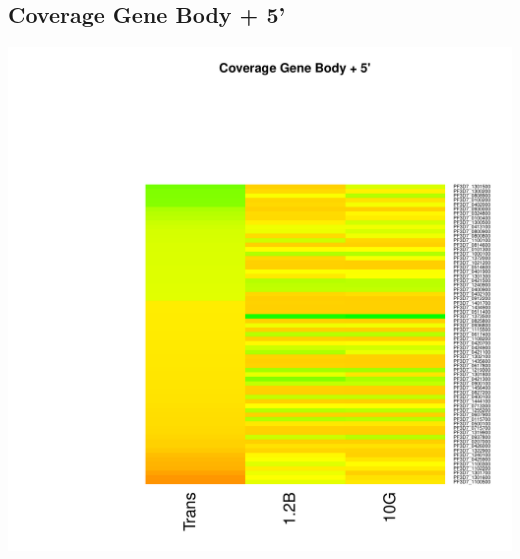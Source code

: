\documentclass{article}\usepackage[]{graphicx}\usepackage[]{color}
\newenvironment{knitrout}{}{} %
\begin{document}
\subsection{Coverage Gene Body + 5'}
\begin{knitrout}
\color{fgcolor}

{\centering \includegraphics[width=.9\linewidth]{figure/minimal-heat_cov_tss_gene-1} 

}



\end{knitrout}
\clearpage
\end{document}
